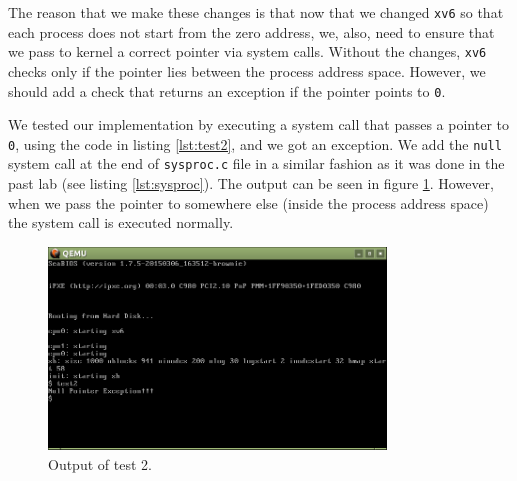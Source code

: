 \documentclass[a4paper,10pt]{scrartcl}
\begin{document}
The reason that we make these changes is that now that we changed \texttt{xv6} so that each process does not start from the zero address, we, also, need to ensure that we pass to kernel a correct pointer via system calls. Without the changes, \texttt{xv6} checks only if the pointer lies between the process address space. However, we should add a check that returns an exception if the pointer points to \texttt{0}.  

We tested our implementation by executing a system call that passes a pointer to \texttt{0}, using the code in listing \ref{lst:test2}, and we got an exception. We add the \texttt{null} system call at the end of \texttt{sysproc.c} file in a similar fashion as it was done in the past lab  (see listing \ref{lst:sysproc}).  The output can be seen in figure \ref{fig:test2}.  However, when we pass the pointer to somewhere else (inside the process address space) the system call is executed normally. 





\begin{figure}
  \centering
  \includegraphics[width=0.8\textwidth]{figures/test2.png}
  \caption{Output of test 2.}\label{fig:test2}
\end{figure}
\end{document}

